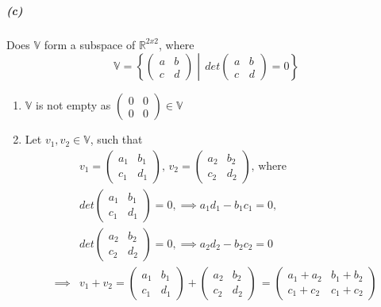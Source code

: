 \documentclass[12pt, letterpaper]{article}
\begin{document}
\subparagraph{(c)} Does $\mathbb{V}$ form a subspace of $\mathbb{R}^{2x2}$, where
\[
  \mathbb{V} = \left\{\begin{pmatrix}a&b\\c&d\end{pmatrix}\middle| \,
  det\begin{pmatrix}a&b\\c&d\end{pmatrix} = 0\right\}
\]

\begin{enumerate}
  \item $\mathbb{V}$ is not empty as $\begin{pmatrix}0&0\\0&0\end{pmatrix}\in\mathbb{V}$
  \item Let $v_1, v_2 \in \mathbb{V}$, such that
  \[
    \begin{split}
    &v_1 = \begin{pmatrix}a_1&b_1\\c_1&d_1\end{pmatrix},\,
    v_2 = \begin{pmatrix}a_2&b_2\\c_2&d_2\end{pmatrix},\,
    \text{where }\\
    &det\begin{pmatrix}a_1&b_1\\c_1&d_1\end{pmatrix} = 0, \implies a_1d_1-b_1c_1 = 0,\\
    &det\begin{pmatrix}a_2&b_2\\c_2&d_2\end{pmatrix} = 0, \implies a_2d_2-b_2c_2 = 0\\
    \implies &v_1 + v_2
    = \begin{pmatrix}a_1&b_1\\c_1&d_1\end{pmatrix} +
    \begin{pmatrix}a_2&b_2\\c_2&d_2\end{pmatrix}\,
    =\begin{pmatrix}a_1 + a_2 &b_1 + b_2\\c_1 + c_2 &c_1 + c_2\end{pmatrix}\\

\end{split}\]
\end{enumerate}
\end{document}
